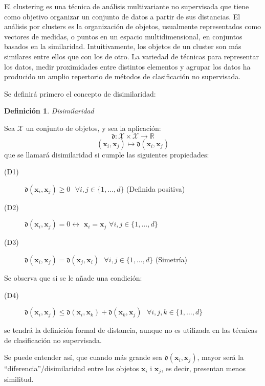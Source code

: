 \documentclass{article}
\newtheorem*{defi} {Definición}
\begin{document}
El clustering es una técnica de análisis multivariante no supervisada que tiene como objetivo organizar un conjunto de datos a partir de sus distancias. El análisis por clusters es la organización de objetos, usualmente representados como vectores de medidas, o puntos en un espacio multidimensional, en conjuntos basados en la similaridad. Intuitivamente, los objetos de un cluster son más similares entre ellos que con los de otro. La variedad de técnicas para representar los datos, medir proximidades entre distintos elementos y agrupar los datos ha producido un amplio repertorio de métodos de clasificación no supervisada.

Se definirá primero el concepto de disimilaridad:
\begin{defi} Disimilaridad \end{defi}
Sea $\mathscr{X}$ un conjunto de objetos, y sea la aplicación:
$$
\mathfrak{d}:\mathscr{X}\times\mathscr{X}\longrightarrow \mathds{R}
$$
$$
(\mathbf{x}_{i},\mathbf{x}_{j})\longmapsto \mathfrak{d}(\mathbf{x}_{i},\mathbf{x}_{j})
$$
que se llamará disimilaridad si cumple las siguientes propiedades:
\begin{description}
\item[(D1)] $\mathfrak{d}(\mathbf{x}_{i},\mathbf{x}_{j})\geq 0\,\,\,\, \forall i,j\in \{1,\dots,d\}$  (Definida positiva)
\item[(D2)] $\mathfrak{d}(\mathbf{x}_{i},\mathbf{x}_{j})=0\longleftrightarrow \,\, \mathbf{x}_{i}=\mathbf{x}_{j}\,\, \forall i,j\in \{1,\dots,d\}$
\item[(D3)] $\mathfrak{d}(\mathbf{x}_{i},\mathbf{x}_{j})=\mathfrak{d}(\mathbf{x}_{j},\mathbf{x}_{i})\,\,\,\, \forall i,j\in \{1,\dots,d\}$  (Simetría)
\end{description}

Se observa que si se le añade una condición:
\begin{description}
\item[(D4)] $\mathfrak{d}(\mathbf{x}_{i},\mathbf{x}_{j})\leq \mathfrak{d}(\mathbf{x}_{i},\mathbf{x}_{k})+\mathfrak{d}(\mathbf{x}_{k},\mathbf{x}_{j}) \,\,\,\, \forall i,j,k\in \{1,\dots,d\}$
\end{description}
se tendrá la definición formal de distancia, aunque no es utilizada en las técnicas de clasificación no supervisada. 

Se puede entender así, que cuando más grande sea $\mathfrak{d}(\mathbf{x}_{i},\mathbf{x}_{j})$, mayor será la ``diferencia''/disimilaridad entre los objetos $\mathbf{x}_{i}$ i $\mathbf{x}_{j}$, es decir, presentan menos similitud.
\end{document}
